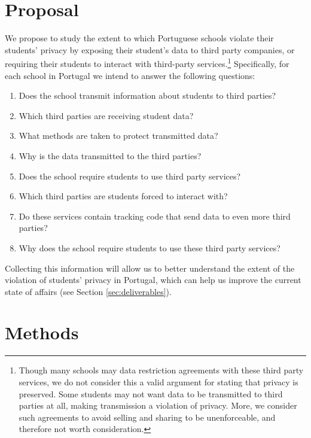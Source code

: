 \documentclass[twoside,twocolumn]{article}
\begin{document}
\section{Proposal}
\label{sec:proposal}

We propose to study the extent to which Portuguese schools violate their students' privacy by exposing their student's data to third party companies, or requiring their students to interact with third-party services.\footnote{Though many schools may data restriction agreements with these third party services, we do not consider this a valid argument for stating that privacy is preserved. Some students may not want data to be transmitted to third parties at all, making transmission a violation of privacy. More, we consider such agreements to avoid selling and sharing to be unenforceable, and therefore not worth consideration.} Specifically, for each school in Portugal we intend to answer the following questions:

\begin{enumerate}
\itemsep0em
\item Does the school transmit information about students to third parties?
\item Which third parties are receiving student data?
\item What methods are taken to protect transmitted data?
\item Why is the data transmitted to the third parties?
\item Does the school require students to use third party services?
\item Which third parties are students forced to interact with?
\item Do these services contain tracking code that send data to even more third parties?
\item Why does the school require students to use these third party services?
\end{enumerate}

Collecting this information will allow us to better understand the extent of the violation of students' privacy in Portugal, which can help us improve the current state of affairs (see Section \ref{sec:deliverables}).


\section{Methods}
\end{document}
